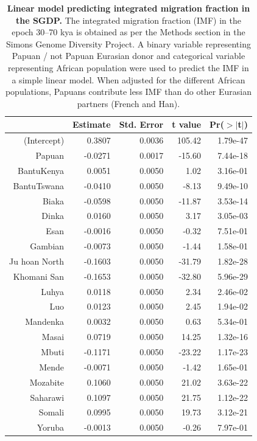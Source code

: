 \documentclass{article}
\begin{document}
\begin{table}[ht]
\centering
\begin{tabular}{rrrrr}
  \hline
 & Estimate & Std. Error & t value & Pr($>$$|$t$|$) \\ 
  \hline
(Intercept) & 0.3807 & 0.0036 & 105.42 & 1.79e-47 \\ 
  Papuan & -0.0271 & 0.0017 & -15.60 & 7.44e-18 \\ 
  BantuKenya & 0.0051 & 0.0050 & 1.02 & 3.16e-01 \\ 
  BantuTswana & -0.0410 & 0.0050 & -8.13 & 9.49e-10 \\ 
  Biaka & -0.0598 & 0.0050 & -11.87 & 3.53e-14 \\ 
  Dinka & 0.0160 & 0.0050 & 3.17 & 3.05e-03 \\ 
  Esan & -0.0016 & 0.0050 & -0.32 & 7.51e-01 \\ 
  Gambian & -0.0073 & 0.0050 & -1.44 & 1.58e-01 \\ 
  Ju hoan North & -0.1603 & 0.0050 & -31.79 & 1.82e-28 \\ 
  Khomani San & -0.1653 & 0.0050 & -32.80 & 5.96e-29 \\ 
  Luhya & 0.0118 & 0.0050 & 2.34 & 2.46e-02 \\ 
  Luo & 0.0123 & 0.0050 & 2.45 & 1.94e-02 \\ 
  Mandenka & 0.0032 & 0.0050 & 0.63 & 5.34e-01 \\ 
  Masai & 0.0719 & 0.0050 & 14.25 & 1.32e-16 \\ 
  Mbuti & -0.1171 & 0.0050 & -23.22 & 1.17e-23 \\ 
  Mende & -0.0071 & 0.0050 & -1.42 & 1.65e-01 \\ 
  Mozabite & 0.1060 & 0.0050 & 21.02 & 3.63e-22 \\ 
  Saharawi & 0.1097 & 0.0050 & 21.75 & 1.12e-22 \\ 
  Somali & 0.0995 & 0.0050 & 19.73 & 3.12e-21 \\ 
  Yoruba & -0.0013 & 0.0050 & -0.26 & 7.97e-01 \\ 
   \hline
\end{tabular}
\caption{{\bf Linear model predicting integrated migration fraction in the SGDP.} The integrated migration fraction (IMF) in the epoch 30--70 kya is obtained as per the Methods section in the Simons Genome Diversity Project.  A binary variable representing Papuan / not Papuan Eurasian donor and categorical variable representing African population were used to predict the IMF in a simple linear model. When adjusted for the different African populations, Papuans contribute less IMF than do other Eurasian partners (French and Han).} 
\label{sgdp:papuan_imf}
\end{table}
\end{document}
